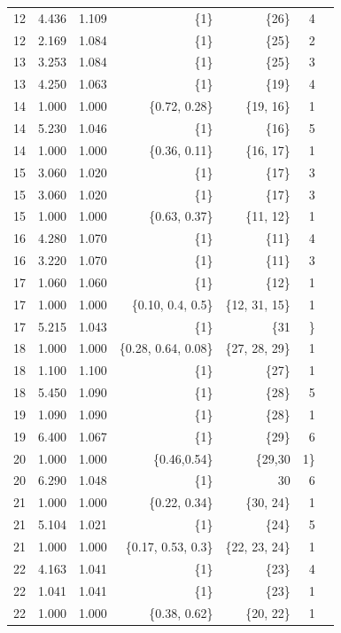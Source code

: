 \documentclass{amsart}
\begin{document}
\begin{table}[!htp]
\begin{tabular}{lrrrrrr}
            12 &4.436 &1.109 &\{1\} &\{26\} &4 \\
            12 &2.169 &1.084 &\{1\} &\{25\} &2 \\
            13 &3.253 &1.084 &\{1\} &\{25\} &3 \\
            13 &4.250 &1.063 &\{1\} &\{19\} &4 \\
            14 &1.000 &1.000 &\{0.72, 0.28\} &\{19, 16\} &1 \\
            14 &5.230 &1.046 &\{1\} &\{16\} &5 \\
            14 &1.000 &1.000 &\{0.36, 0.11\} &\{16, 17\} &1 \\
            15 &3.060 &1.020 &\{1\} &\{17\} &3 \\
            15 &3.060 &1.020 &\{1\} &\{17\} &3 \\
            15 &1.000 &1.000 &\{0.63, 0.37\} &\{11, 12\} &1 \\
            16 &4.280 &1.070 &\{1\} &\{11\} &4 \\
            16 &3.220 &1.070 &\{1\} &\{11\} &3 \\
            17 &1.060 &1.060 &\{1\} &\{12\} &1 \\
            17 &1.000 &1.000 &\{0.10, 0.4, 0.5\} &\{12, 31, 15\} &1 \\
            17 &5.215 &1.043 &\{1\} &\{31 &\} \\
            18 &1.000 &1.000 &\{0.28, 0.64, 0.08\} &\{27, 28, 29\} &1 \\
            18 &1.100 &1.100 &\{1\} &\{27\} &1 \\
            18 &5.450 &1.090 &\{1\} &\{28\} &5 \\
            19 &1.090 &1.090 &\{1\} &\{28\} &1 \\
            19 &6.400 &1.067 &\{1\} &\{29\} &6 \\
            20 &1.000 &1.000 &\{0.46,0.54\} &\{29,30 &1\} \\
            20 &6.290 &1.048 &\{1\} &30 &6 \\
            21 &1.000 &1.000 &\{0.22, 0.34\} &\{30, 24\} &1 \\
            21 &5.104 &1.021 &\{1\} &\{24\} &5 \\
            21 &1.000 &1.000 &\{0.17, 0.53, 0.3\} &\{22, 23, 24\} &1 \\
            22 &4.163 &1.041 &\{1\} &\{23\} &4 \\
            22 &1.041 &1.041 &\{1\} &\{23\} &1 \\
            22 &1.000 &1.000 &\{0.38, 0.62\} &\{20, 22\} &1 \\

\end{tabular}
\end{table}
\end{document}
